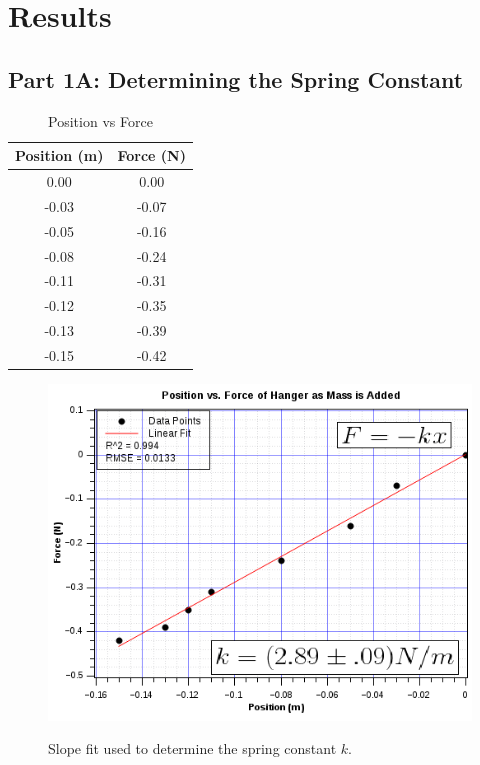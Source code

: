 \documentclass[twocolumn,english]{IEEEtran}
\theoremstyle{plain}
\theoremstyle{plain}
\begin{document}
\section{Results}
\subsection*{\textbf{Part 1A: Determining the Spring Constant}}
\begin{table}[h]
\caption{Position vs Force}
\label{tb:data_determining_k}
\centering{}
\begin{tabular}{|c|c|}
\hline
\textbf{Position (m)} & \textbf{Force (N)} \\ \hline
0.00                  & 0.00               \\ \hline
-0.03                 & -0.07              \\ \hline
-0.05                 & -0.16              \\ \hline
-0.08                 & -0.24              \\ \hline
-0.11                 & -0.31              \\ \hline
-0.12                 & -0.35              \\ \hline
-0.13                 & -0.39              \\ \hline
-0.15                 & -0.42              \\ \hline
\end{tabular}
\end{table}

\begin{figure}[h!]
  \begin{centering}
  \begin{center}
  \includegraphics[width=\linewidth]{./Images/graph1a.png}
  \label{fig:graph_spring_const}
  \caption{Slope fit used to determine the spring constant $k$.}
  \end{center}
  \par\end{centering}
  \end{figure}
\end{document}
